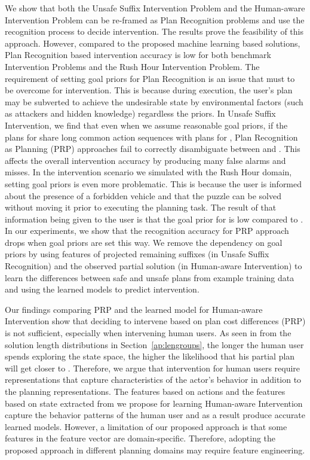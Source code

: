 We show that both the Unsafe Suffix Intervention Problem and the Human-aware Intervention Problem can be re-framed as Plan Recognition problems and use the recognition process to decide intervention. 
The results prove the feasibility of this approach. 
However, compared to the proposed machine learning based solutions, Plan Recognition based intervention accuracy is low for both benchmark Intervention Problems and the Rush Hour Intervention Problem. 
The requirement of setting goal priors for Plan Recognition is an issue that must to be overcome for intervention. 
This is because during execution, the user's plan may be subverted to achieve the undesirable state by environmental factors (such as attackers and hidden knowledge) regardless the priors. 
In Unsafe Suffix Intervention, we find that even when we assume reasonable goal priors, if the plans for \undesired share long common action sequences with plans for \desired, Plan Recognition as Planning (PRP) approaches fail to correctly disambiguate between  \undesired and \desired. 
This affects the overall intervention accuracy by producing many false alarms and misses. 
In the intervention scenario we simulated with the Rush Hour domain, setting goal priors is even more problematic. 
This is because the user is informed about the presence of a forbidden vehicle and that the puzzle can be solved without moving it prior to executing the planning task. 
The result of that information being given to the user is that the goal prior for \undesired is low compared to \desired. 
In our experiments, we show that the recognition accuracy for PRP approach drops when goal priors are set this way. 
We remove the dependency on goal priors by using features of projected remaining suffixes (in Unsafe Suffix Recognition) and the observed partial solution \historyDef (in Human-aware Intervention) to learn the differences between safe and unsafe plans from example training data and using the learned models to predict intervention.

Our findings comparing PRP and the learned model for Human-aware Intervention show that deciding to intervene based on plan cost differences (PRP) is not sufficient, especially when intervening human users.
As seen in from the solution length distributions in Section~\ref{ap:lengroups}, the longer the human user spends exploring the state space, the higher the likelihood that his partial plan will get closer to \undesired. 
Therefore, we argue that intervention for human users require representations that capture characteristics of the actor's behavior in addition to the planning representations. 
The features based on actions and the features based on state extracted from \historyDef we propose for learning Human-aware Intervention capture the behavior patterns of the human user and as a result produce accurate learned models. 
However, a limitation of our proposed approach is that some features in the feature vector are domain-specific. 
Therefore, adopting the proposed approach in different planning domains may require feature engineering.


